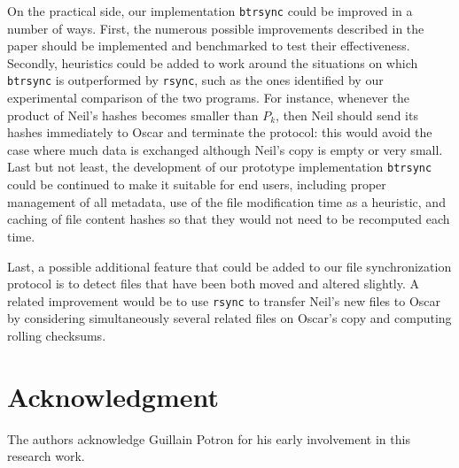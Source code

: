 \documentclass[twoside,envcountsame,runningheads]{llncs}
\newcommand{\btrsync}{\texttt{btrsync}\xspace}
\newcommand{\rsync}{\texttt{rsync}\xspace}
\begin{document}
On the practical side, our implementation \btrsync could be improved in a number of ways. First, the numerous possible improvements described in the paper should be implemented and benchmarked to test their effectiveness. Secondly, heuristics could be added to work around the situations on which \btrsync is outperformed by \rsync, such as the ones identified by our experimental comparison of the two programs. For instance, whenever the product of Neil's hashes becomes smaller than $P_k$, then Neil should send its hashes immediately to Oscar and terminate the protocol: this would avoid the case where much data is exchanged although Neil's copy is empty or very small. Last but not least, the development of our prototype implementation \btrsync could be continued to make it suitable for end users, including proper management of all metadata, use of the file modification time as a heuristic, and caching of file content hashes so that they would not need to be recomputed each time.

Last, a possible additional feature that could be added to our file synchronization protocol is to detect files that have been both moved and altered slightly. A related improvement would be to use \rsync to transfer Neil's new files to Oscar by considering simultaneously several related files on Oscar's copy and computing rolling checksums.


\section{Acknowledgment}

The authors acknowledge Guillain Potron for his early involvement in this research work.
\end{document}
